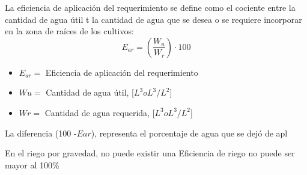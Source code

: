 La eficiencia de aplicación del requerimiento se define como el cociente entre la cantidad de agua útil t la cantidad de agua que se desea o se requiere incorporar en la zona de raíces de los cultivos:
\begin{equation}
    E_{ar}= \left(\frac{W_u}{W_r}\right) \cdot  100
\end{equation}
\begin{notation}
    \begin{itemize}
        \item $E_{ar}=$ Eficiencia de aplicación del requerimiento
        \item $Wu =$ Cantidad de agua útil, [$L^3 o L^3/L^2$]
        \item $Wr =$ Cantidad de agua requerida, [$L^3 o L^3/L^2$]
    \end{itemize}
\end{notation}
La diferencia (100 -$ E{ar}$), representa el porcentaje de agua que se dejó de apl

En el riego por gravedad, no puede existir una Eficiencia de riego no puede ser mayor al 100\%


